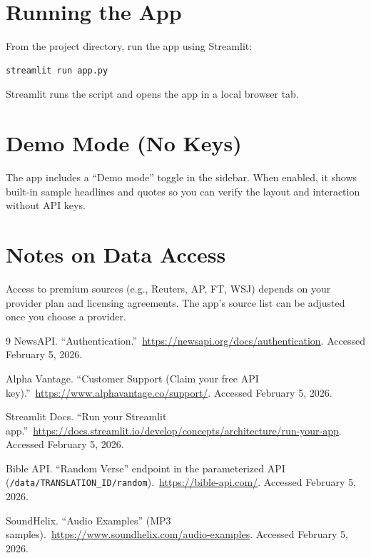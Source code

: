 \documentclass[11pt]{article}
\begin{document}
\section*{Running the App}
From the project directory, run the app using Streamlit:
\begin{verbatim}
streamlit run app.py
\end{verbatim}
Streamlit runs the script and opens the app in a local browser tab.\cite{streamlit-run}

\section*{Demo Mode (No Keys)}
The app includes a ``Demo mode'' toggle in the sidebar. When enabled, it shows built-in sample headlines and quotes so you can verify the layout and interaction without API keys.

\section*{Notes on Data Access}
Access to premium sources (e.g., Reuters, AP, FT, WSJ) depends on your provider plan and licensing agreements. The app’s source list can be adjusted once you choose a provider.

\begin{thebibliography}{9}
NewsAPI. ``Authentication.''\
\url{https://newsapi.org/docs/authentication}. Accessed February 5, 2026.

Alpha Vantage. ``Customer Support (Claim your free API key).''\
\url{https://www.alphavantage.co/support/}. Accessed February 5, 2026.

\bibitem{streamlit-run}
Streamlit Docs. ``Run your Streamlit app.''\
\url{https://docs.streamlit.io/develop/concepts/architecture/run-your-app}. Accessed February 5, 2026.

\bibitem{bible-api}
Bible API. ``Random Verse'' endpoint in the parameterized API (\texttt{/data/TRANSLATION\_ID/random}).\
\url{https://bible-api.com/}. Accessed February 5, 2026.

SoundHelix. ``Audio Examples'' (MP3 samples).\
\url{https://www.soundhelix.com/audio-examples}. Accessed February 5, 2026.
\end{thebibliography}
\end{document}
